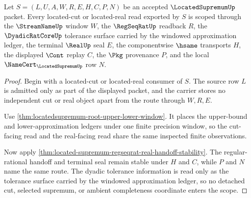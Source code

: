 \begin{theorem}
\label{thm:locatedsupremum-streamname-cut-scope}
Let $S=(L,U,A,W,R,E,H,C,P,N)$ be an accepted $\LocatedSupremumUp$ packet. Every located-cut or located-real read exported by $S$ is scoped through the $\StreamNameUp$ window $W$, the $\RegSeqRatUp$ readback $R$, the $\DyadicRatCoreUp$ tolerance surface carried by the windowed approximation ledger, the terminal $\RealUp$ seal $E$, the componentwise $\hsame$ transports $H$, the displayed $\Cont$ replay $C$, the $\Pkg$ provenance $P$, and the local $\NameCert_{\LocatedSupremumUp}$ row $N$.
\end{theorem}
\begin{proof}
Begin with a located-cut or located-real consumer of $S$. The source row $L$ is admitted only as part of the displayed packet, and the carrier stores no independent cut or real object apart from the route through $W,R,E$.

Use \autoref{thm:locatedsupremum-root-upper-lower-window}. It places the upper-bound and lower-approximation ledgers under one finite precision window, so the cut-facing read and the real-facing read share the same inspected finite observations.

Now apply \autoref{thm:located-supremum-regseqrat-real-handoff-stability}. The regular-rational handoff and terminal seal remain stable under $H$ and $C$, while $P$ and $N$ name the same route. The dyadic tolerance information is read only as the tolerance surface carried by the windowed approximation ledger, so no detached cut, selected supremum, or ambient completeness coordinate enters the scope.
\end{proof}

